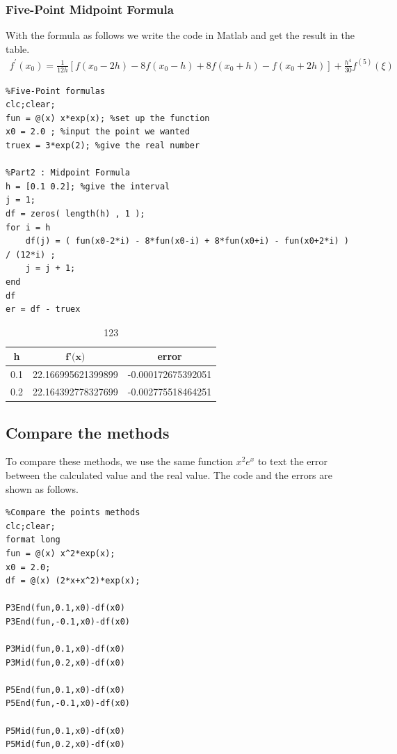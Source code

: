 \documentclass{article}
\begin{document}
\subsubsection{Five-Point Midpoint Formula}
With the formula as follows we write the code in Matlab and get the result in the table.
\begin{align}
    f^{\prime}\left(x_{0}\right)=\frac{1}{12 h}\left[f\left(x_{0}-2 h\right)-8 f\left(x_{0}-h\right)+8 f\left(x_{0}+h\right)-f\left(x_{0}+2 h\right)\right]+\frac{h^{4}}{30} f^{(5)}(\xi)\nonumber
\end{align}
\begin{lstlisting}
%Five-Point formulas
clc;clear;
fun = @(x) x*exp(x); %set up the function
x0 = 2.0 ; %input the point we wanted
truex = 3*exp(2); %give the real number

%Part2 : Midpoint Formula
h = [0.1 0.2]; %give the interval
j = 1;
df = zeros( length(h) , 1 );
for i = h
    df(j) = ( fun(x0-2*i) - 8*fun(x0-i) + 8*fun(x0+i) - fun(x0+2*i) ) / (12*i) ; 
    j = j + 1;
end
df
er = df - truex
\end{lstlisting}
\begin{table}[!ht]
    \centering
    \begin{tabular}{|c|c|c|}
    \hline
        \textbf{h} & $\textbf{f'(x)}$ & \textbf{error} \\ \hline
        0.1 &   22.166995621399899  &   -0.000172675392051  \\ \hline
        0.2 &   22.164392778327699  &   -0.002775518464251  \\ \hline
    \end{tabular}
    \caption{123}
    \label{5PM}
\end{table}

\subsection{Compare the methods}
To compare these methods, we use the same function $x^2e^x$ to text the error between the calculated value and the real value. The code and the errors are shown as follows.
\begin{lstlisting}
%Compare the points methods
clc;clear;
format long
fun = @(x) x^2*exp(x);
x0 = 2.0;
df = @(x) (2*x+x^2)*exp(x);

P3End(fun,0.1,x0)-df(x0)
P3End(fun,-0.1,x0)-df(x0)

P3Mid(fun,0.1,x0)-df(x0)
P3Mid(fun,0.2,x0)-df(x0)

P5End(fun,0.1,x0)-df(x0)
P5End(fun,-0.1,x0)-df(x0)

P5Mid(fun,0.1,x0)-df(x0)
P5Mid(fun,0.2,x0)-df(x0)
\end{lstlisting}
\end{document}
